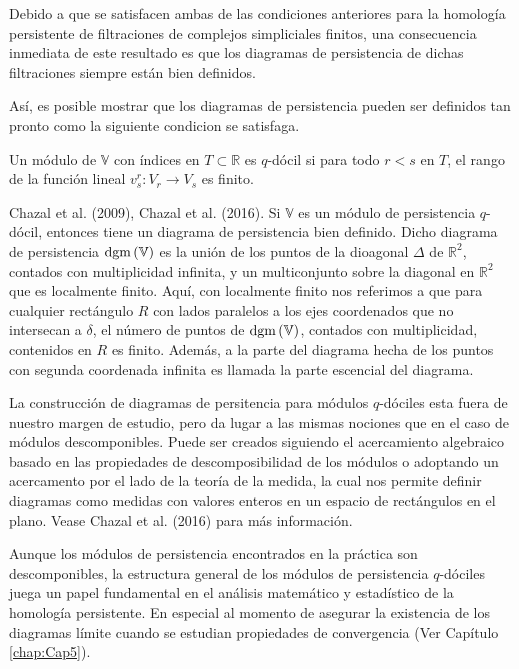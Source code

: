 Debido a que se satisfacen ambas de las condiciones anteriores para la homolog\'ia persistente de filtraciones de complejos simpliciales finitos,
una consecuencia inmediata de este resultado es que los diagramas de persistencia de dichas filtraciones siempre est\'an bien definidos.

As\'i, es posible mostrar que los diagramas de persistencia pueden ser definidos tan pronto como la siguiente condicion se satisfaga.

\begin{definicion}
    Un m\'odulo de $\mathbb{V}$ con \'indices en $T\subset\mathbb{R}$ es $q$-d\'ocil
    si para todo $r<s$ en $T$, el rango de la funci\'on lineal $v_{s}^{r}:V_{r}\rightarrow V_{s}$ es finito.
\end{definicion}

\begin{teorema}
    Chazal et al. (2009)\cite{Chazal2009a}, Chazal et al. (2016)\cite{Chazal2016a}.
    Si $\mathbb{V}$ es un m\'odulo de persistencia $q$-d\'ocil,
    entonces tiene un diagrama de persistencia bien definido.
    Dicho diagrama de persistencia $\mathrm{dgm}\left(\mathbb{V}\right)$
    es la uni\'on de los puntos de la dioagonal $\Delta$ de $\mathbb{R}^{2}$,
    contados con multiplicidad infinita,
    y un multiconjunto sobre la diagonal en $\mathbb{R}^{2}$ que es localmente finito.
    Aqu\'i, con localmente finito nos referimos a que
    para cualquier rect\'angulo $R$ con lados paralelos a los ejes coordenados que no intersecan a $\delta$,
    el n\'umero de puntos de $\mathrm{dgm}\left(\mathbb{V}\right)$, contados con multiplicidad,
    contenidos en $R$ es finito.
    Adem\'as, a la parte del diagrama hecha de los puntos con segunda coordenada infinita
    es llamada la parte escencial del diagrama.
\end{teorema}

La construcci\'on de diagramas de persitencia para m\'odulos $q$-d\'ociles
esta fuera de nuestro margen de estudio,
pero da lugar a las mismas nociones que en el caso de m\'odulos descomponibles.
Puede ser creados siguiendo el acercamiento algebraico
basado en las propiedades de descomposibilidad de los m\'odulos
o adoptando un acercamento por el lado de la teor\'ia de la medida,
la cual nos permite definir diagramas como medidas con valores enteros en un espacio de rect\'angulos en el plano.
Vease Chazal et al. (2016)\cite{Chazal2016a} para m\'as informaci\'on.

Aunque los m\'odulos de persistencia encontrados en la pr\'actica son descomponibles,
la estructura general de los m\'odulos de persistencia $q$-d\'ociles juega un papel fundamental
en el an\'alisis matem\'atico y estad\'istico de la homolog\'ia persistente.
En especial al momento de asegurar la existencia de los diagramas l\'imite
cuando se estudian propiedades de convergencia (Ver Cap\'itulo \ref{chap:Cap5}).

